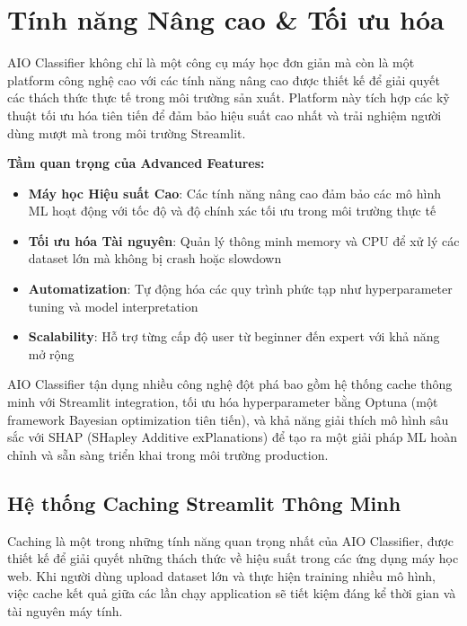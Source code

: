 \section{Tính năng Nâng cao \& Tối ưu hóa}\label{sec:advanced-features}

\noindent
AIO Classifier không chỉ là một công cụ máy học đơn giản mà còn là một platform công nghệ cao với các tính năng nâng cao được thiết kế để giải quyết các thách thức thực tế trong môi trường sản xuất. Platform này tích hợp các kỹ thuật tối ưu hóa tiên tiến để đảm bảo hiệu suất cao nhất và trải nghiệm người dùng mượt mà trong môi trường Streamlit.

\textbf{Tầm quan trọng của Advanced Features:}
\begin{itemize}[leftmargin=*]
    \item \textbf{Máy học Hiệu suất Cao}: Các tính năng nâng cao đảm bảo các mô hình ML hoạt động với tốc độ và độ chính xác tối ưu trong môi trường thực tế
    \item \textbf{Tối ưu hóa Tài nguyên}: Quản lý thông minh memory và CPU để xử lý các dataset lớn mà không bị crash hoặc slowdown
    \item \textbf{Automatization}: Tự động hóa các quy trình phức tạp như hyperparameter tuning và model interpretation
    \item \textbf{Scalability}: Hỗ trợ từng cấp độ user từ beginner đến expert với khả năng mở rộng
\end{itemize}

AIO Classifier tận dụng nhiều công nghệ đột phá bao gồm hệ thống cache thông minh với Streamlit integration, tối ưu hóa hyperparameter bằng Optuna (một framework Bayesian optimization tiên tiến), và khả năng giải thích mô hình sâu sắc với SHAP (SHapley Additive exPlanations) để tạo ra một giải pháp ML hoàn chỉnh và sẵn sàng triển khai trong môi trường production.

\subsection{Hệ thống Caching Streamlit Thông Minh}\label{subsec:intelligent-caching}

\noindent
Caching là một trong những tính năng quan trọng nhất của AIO Classifier, được thiết kế để giải quyết những thách thức về hiệu suất trong các ứng dụng máy học web. Khi người dùng upload dataset lớn và thực hiện training nhiều mô hình, việc cache kết quả giữa các lần chạy application sẽ tiết kiệm đáng kể thời gian và tài nguyên máy tính.

